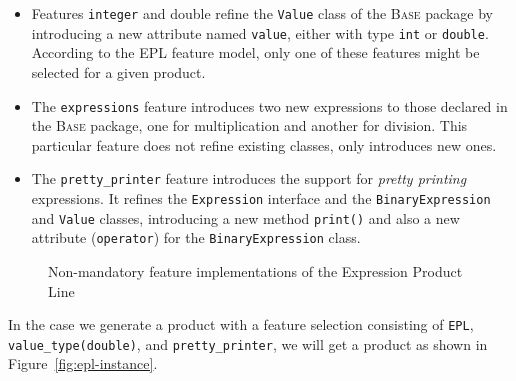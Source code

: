 \begin{itemize}
\item Features \texttt{integer} and {double} refine the \texttt{Value} class of 
the \textsc{Base} package by introducing a new attribute named 
\texttt{value}, either with type \texttt{int} or \texttt{double}. According 
to the EPL feature model, only one of these features might be selected for 
a given product. 

\item The \texttt{expressions} feature introduces two new expressions 
to those declared in the \textsc{Base} package, one for multiplication 
and another for division. This particular feature does not refine 
existing classes, only introduces new ones. 

\item The \texttt{pretty\_printer} feature introduces the support for 
\emph{pretty printing} expressions. It refines the \texttt{Expression} 
interface and the \texttt{BinaryExpression} and \texttt{Value} classes, 
introducing a new method \texttt{print()} and also a 
new attribute (\texttt{operator}) for the \texttt{BinaryExpression} class.

\end{itemize}


\begin{figure}[htb]
\label{fig:epl-features}
\caption{Non-mandatory feature implementations of the Expression Product Line}
\end{figure} 

In the case we generate a product with  
a feature selection consisting of 
\texttt{EPL}, \texttt{value\_type(double)}, 
and \texttt{pretty\_printer}, we will get 
a product as shown in Figure~\ref{fig:epl-instance}. 



